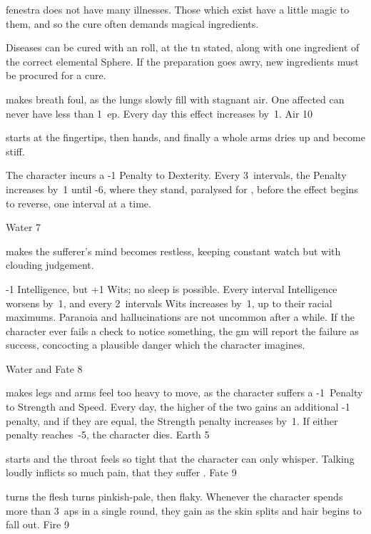 \begin{multicols}{2}
\renewcommand\npcsymbol{\glssymbol{eldren}}

\noindent
\Gls{fenestra} does not have many illnesses.
Those which exist have a little magic to them, and so the cure often demands magical \glspl{ingredient}.

Diseases can be cured with an  roll, at the \gls{tn} stated, along with one \gls{ingredient} of the correct elemental Sphere.
If the preparation goes awry, new \glspl{ingredient} must be procured for a cure.

%
  {makes breath foul, as the lungs slowly fill with stagnant air.
    One affected can never have less than 1~\gls{ep}.
    Every day this effect increases by~1.
  }%
  {Air}%
  {10}

%
  {starts at the fingertips, then hands, and finally a whole arms dries up and become stiff.

    The character incurs a -1 Penalty to Dexterity.
    Every 3~\glspl{interval}, the Penalty increases by~1 until -6, where they stand, paralysed for , before the effect begins to reverse, one \gls{interval} at a time.}%
  {Water}%
  {7}

%
  {makes the sufferer's mind becomes restless, keeping constant watch but with clouding judgement.

    -1 Intelligence, but +1 Wits; no sleep is possible.
    Every \gls{interval} Intelligence worsens by~1, and every 2~\glspl{interval} Wits increases by~1, up to their racial maximums.%
    Paranoia and hallucinations are not uncommon after a while.
    If the character ever fails a check to notice something, the \gls{gm} will report the failure as success, concocting a plausible danger which the character imagines.}%
  {Water and Fate}%
  {8}

%
  {makes legs and arms feel too heavy to move, as the character suffers a -1~Penalty to Strength and Speed.
  Every day, the higher of the two gains an additional -1 penalty, and if they are equal, the Strength penalty increases by~1.
  If either penalty reaches~-5, the character dies.}%
  {Earth}%
  {5}

%
  {starts and the throat feels so tight that the character can only whisper.
  Talking loudly inflicts so much pain, that they suffer .}%
  {Fate}%
  {9}

%
  {turns the flesh turns pinkish-pale, then flaky.
  Whenever the character spends more than 3~\glspl{ap} in a single round, they gain  as the skin splits and hair begins to fall out.}%
  {Fire}%
  {9}

\end{multicols}
